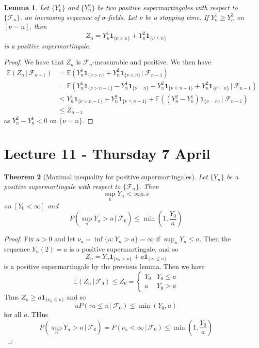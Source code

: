 \documentclass[10pt, oneside, reqno]{amsart}
\theoremstyle{plain}%
\newtheorem{thm}{Theorem}[section]
\newtheorem{lem}[thm]{Lemma}
\theoremstyle{definition}
\theoremstyle{remark}
\newcommand{\given}{ \, | \,}
\newcommand{\sigf}{\mathcal{F}}
\newcommand{\E}{\mathbb{E}}
\newcommand{\indic}[1]{\mathbf{1}_{\{ #1 \}} }
\begin{document}
\begin{lem}
    Let $\{ Y_n^1 \}$ and $\{ Y_n^2 \}$ be two positive supermartingales with respect to $\{ \sigf_n \}$, an increasing sequence of $\sigma$-fields.  Let $\nu$ be a stopping time.  If $Y_n^1 \geq Y_n^2$ on $[\nu = n]$, then \[
        Z_n = Y_n^1 \indic{\nu > n} + Y_n^2 \indic{\nu \leq n}
    \] is a positive supermartingale.  
\end{lem}


\begin{proof}
    We have that $Z_n$ is $\sigf_n$-measurable and positive.  We then have \begin{align*}
        \E(Z_n \given \sigf_{n-1}) &= \E( Y_n^1 \indic{\nu > n} + Y_n^2 \indic{\nu \leq n} \given \sigf_{n-1}) \\
        &= \E( Y_n^1 \indic{\nu > n-1} - Y_n^1 \indic{\nu = n} + Y_n^2 \indic{\nu \leq n-1} + Y_n^2 \indic{\nu = n}\given \sigf_{n-1}) \\
        &\leq Y_n^1 \indic{\nu > n-1} + Y_n^2 \indic{\nu \leq n-1} + \E((Y_n^2 - Y_n^1) \indic{\nu = n} \given \sigf_{n-1}) \\
        &\leq Z_{n-1} 
    \end{align*} as $Y_n^2 - Y_n^1 < 0$ on $\{ \nu = n \}$.  
\end{proof}

\section{Lecture 11 - Thursday 7 April} %
\label{sec:lecture_11_thursday_7_april}

\begin{thm}[Maximal inequality for positive supermartingales]
    Let $\{ Y_n \}$ be a positive supermartingale with respect to $\{ \sigf_n \}$.  Then \[
        \sup_{n } Y_n < \infty a.s
    \] on $[Y_0 < \infty]$ and \[
        P(\sup_{n} Y_n > a \, | \, \sigf_0 ) \leq \min(1, \frac{Y_0}{a})
    \]
\end{thm}
\begin{proof}
    Fix $a > 0$ and let $\nu_a= \inf \{ n : Y_n > a \} = \infty$ if $\sup_n Y_n \leq a$.  Then the sequence $Y_n(2) = a$ is a positive supermartingale, and so \[
        Z_n = Y_n \indic{\nu_a> n} + a \indic{\nu_a\leq n}
    \] is a positive supermartingale by the previous lemma.  Then we have \[
        \E(Z_n \, | \, \sigf_0) \leq Z_0 = \begin{cases}
            Y_0 & Y_0 \leq a \\
            a  & Y_0 > a
        \end{cases}
    \]  Thus $Z_n \geq a \indic{\nu_a\leq n}$ and so \[
        a P({va \leq n \given \sigf_0}) \leq \min(Y_0, a) 
    \] for all $a$.  THus \[
        P(\sup_{n} Y_n > a \given \sigf_0 ) = P(\nu_a< \infty \given \sigf_0) \leq \min(1, \frac{Y_0}{a})
    \]
\end{proof}
\end{document}
